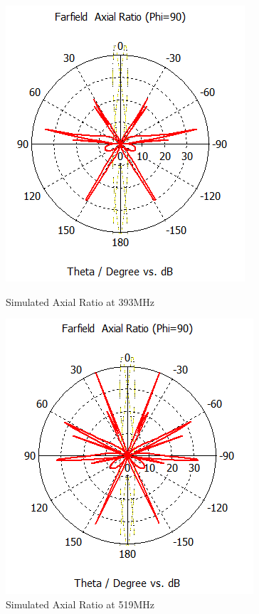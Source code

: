 \begin{figure}[H]
  \centering
  \begin{minipage}[b]{0.5\textwidth}
	\includegraphics[scale = 0.6]{figures/antennas/qha/qha_6_ff_393_AR}
	\caption{Simulated Axial Ratio at 393MHz}
    \label{fig:QHA_ff_393_AR}
  \end{minipage}
  \hfill
  \begin{minipage}[b]{0.4\textwidth}
\includegraphics[scale = 0.6]{figures/antennas/qha/qha_6_ff_519_AR}
\caption{Simulated Axial Ratio at 519MHz}
    \label{fig:QHA_ff_519_AR}
  \end{minipage}
\end{figure}

